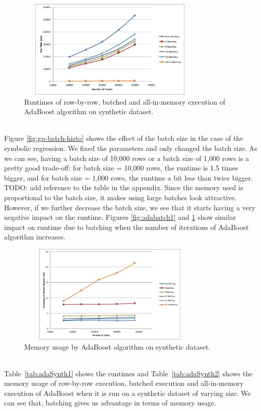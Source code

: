 \begin{figure}[ht]
\centering
\includegraphics[width=0.8\textwidth,height=180px]{ada3.png}
\caption{Runtimes of row-by-row, batched and all-in-memory execution of AdaBoost algorithm on synthetic dataset.}
\label{fig:adabatch2}
\end{figure}

~~\\
Figure \ref{fig:gp-batch-histo} shows the effect of the batch size in the case of the symbolic regression. We fixed the parameters and only changed the batch size. As we can see, having a batch size of 10,000 rows or a batch size of 1,000 rows is a pretty good trade-off: for batch size = 10,000 rows, the runtime is 1.5  times bigger, and for batch size = 1,000 rows, the runtime a bit less than twice bigger. TODO: add reference to the table in the appendix. Since the memory used is proportional to the batch size, it makes using large batches look attractive. However, if we further decrease the batch size, we see that it starts having a very negative impact on the runtime. Figures \ref{fig:adabatch1} and \ref{fig:adabatch2} show similar impact on runtime due to batching when the number of iterations of AdaBoost algorithm increases.


\begin{figure}[ht]
\centering
\includegraphics[width=0.8\textwidth,height=180px]{ada4.png}
\caption{Memory usage by AdaBoost algorithm on synthetic dataset.}
\label{fig:adamem}
\end{figure}

~~\\
Table~\ref{tab:adaSynth1} shows the runtimes and Table~\ref{tab:adaSynth2} shows the memory usage of row-by-row execution, batched execution and all-in-memory execution of AdaBoost when it is run on a synthetic dataset of varying size. We can see that, batching gives us advantage in terms of memory usage.




